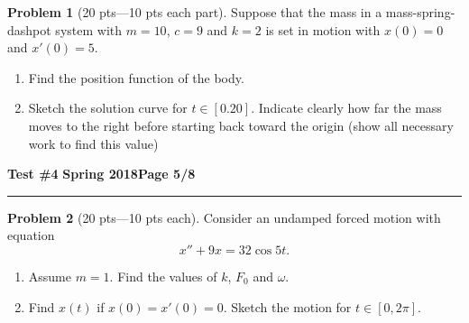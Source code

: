 \documentclass[12pt]{article}
\theoremstyle{definition}
\newtheorem{problem}{Problem}
\begin{document}
\bigskip
\begin{problem}[20 pts---10 pts each part]
Suppose that the mass in a mass-spring-dashpot system with $m=10$, $c=9$ and $k=2$ is set in motion with $x(0)=0$ and $x'(0)=5$.
\begin{enumerate}
  \item Find the position function of the body.
  \vspace{4cm}
  \begin{flushright}
  \end{flushright}
  \item Sketch the solution curve for $t \in [0.20]$.  Indicate clearly how far the mass moves to the right before starting back toward the origin (show all necessary work to find this value)
\end{enumerate}
\end{problem}
\newpage

\hfill{\large\bf Test \#4}\hfill{\large\bf
  Spring 2018}\hfill{\large\bf Page 5/8}\hrule

\bigskip
\begin{problem}[20 pts---10 pts each]
Consider an undamped forced motion with equation 
\begin{equation*}
x''+9x=32\cos 5t.
\end{equation*}
\begin{enumerate}
  \item Assume $m=1$.  Find the values of $k$, $F_0$ and $\omega$.
  \begin{flushright}
  \end{flushright}
  \item Find $x(t)$ if $x(0)=x'(0)=0$.  Sketch the motion for $t \in [0,2\pi]$. 
  \vspace{16cm}
  \begin{flushright}
  \end{flushright}
\end{enumerate}
\end{problem}
\newpage
\end{document}
